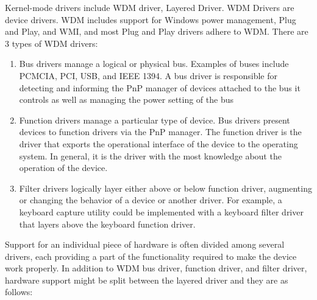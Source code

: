 \documentclass[letterpaper,10pt,draftclsnofoot,onecolumn]{IEEEtran}
\begin{document}
Kernel-mode drivers include WDM driver, Layered Driver. 
WDM Drivers are device drivers. WDM includes support for Windows power management, Plug and Play, and WMI, and most Plug and Play drivers adhere to WDM. There are 3 types of WDM drivers:\cite{[1]}
\begin{enumerate}
\item Bus drivers manage a logical or physical bus. Examples of buses include PCMCIA, PCI, USB, and IEEE 1394. A bus driver is responsible for detecting and informing the PnP manager of devices attached to the bus it controls as well as managing the power setting of the bus
\item Function drivers manage a particular type of device. Bus drivers present devices to function drivers via the PnP manager. The function driver is the driver that exports the operational interface of the device to the operating system. In general, it is the driver with the most knowledge about the operation of the device.
\item Filter drivers logically layer either above or below function driver, augmenting or changing the behavior of a device or another driver. For example, a keyboard capture utility could be implemented with a keyboard filter driver that layers above the keyboard function driver.
\end{enumerate}
Support for an individual piece of hardware is often divided among several drivers, each providing a part of the functionality required to make the device work properly. In addition to WDM bus driver, function driver, and filter driver, hardware support might be split between the layered driver and they are as follows: \cite{[1]}
\end{document}
